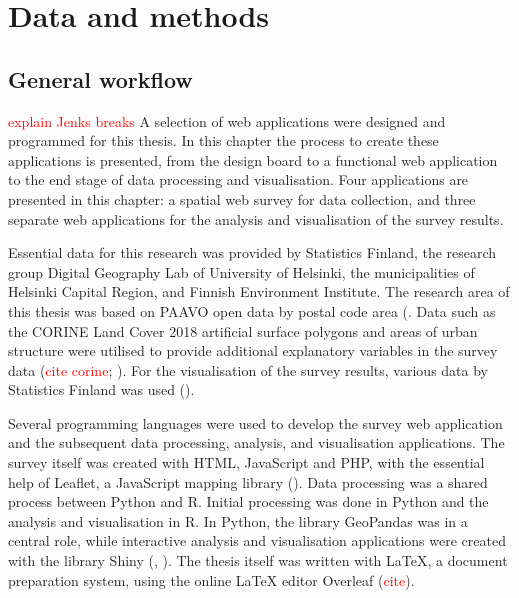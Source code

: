 \section{Data and methods}
\subsection{General workflow}
\justify

\textcolor{red}{explain Jenks breaks}
A selection of web applications were designed and programmed for this thesis. In this chapter the process to create these applications is presented, from the design board to a functional web application to the end stage of data processing and visualisation. Four applications are presented in this chapter: a spatial web survey for data collection, and three separate web applications for the analysis and visualisation of the survey results.

Essential data for this research was provided by Statistics Finland, the research group Digital Geography Lab of University of Helsinki, the municipalities of Helsinki Capital Region, and Finnish Environment Institute. The research area of this thesis was based on PAAVO open data by postal code area (\cite{StatisticsFinland2019a}. Data such as the CORINE Land Cover 2018 artificial surface polygons and areas of urban structure were utilised to provide additional explanatory variables in the survey data (\textcolor{red}{cite corine}; \cite{Ristimaki2017}). For the visualisation of the survey results, various data by Statistics Finland was used (\cite{StatisticsFinland2012}).

Several programming languages were used to develop the survey web application and the subsequent data processing, analysis, and visualisation applications. The survey itself was created with HTML, JavaScript and PHP, with the essential help of Leaflet, a JavaScript mapping library (\cite{Agafonkin2019}). Data processing was a shared process between Python and R. Initial processing was done in Python and the analysis and visualisation in R. In Python, the library GeoPandas was in a central role, while interactive analysis and visualisation applications were created with the library Shiny (\cite{GeoPandasDevelopers2019}, \cite{Chang2019}). The thesis itself was written with LaTeX, a document preparation system, using the online LaTeX editor Overleaf (\textcolor{red}{cite}).

